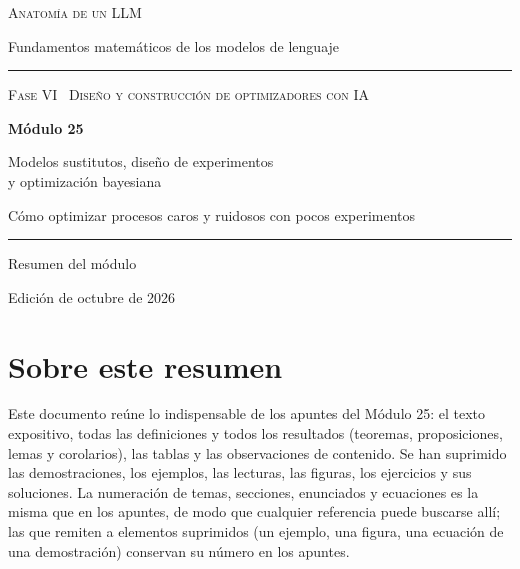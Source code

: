 \documentclass[11pt,a4paper,twoside,openany]{book}
\begin{document}
\frontmatter
\begin{titlepage}
\centering
\vspace*{2.5cm}
{\large\scshape Anatomía de un LLM}\par
\vspace{0.4cm}
{\normalsize Fundamentos matemáticos de los modelos de lenguaje}\par
\vspace{2.2cm}
\rule{\textwidth}{0.8pt}\par\vspace{0.5cm}
{\small\scshape Fase VI \textperiodcentered\ Diseño y construcción de optimizadores con IA}\par\vspace{0.3cm}
{\Huge\bfseries Módulo 25\par}\vspace{0.3cm}
{\LARGE Modelos sustitutos, diseño de experimentos\\[2pt] y optimización bayesiana\par}
\vspace{0.2cm}
{\large Cómo optimizar procesos caros y ruidosos con pocos experimentos\par}
\vspace{0.5cm}\rule{\textwidth}{0.4pt}\par
\vspace{1.6cm}
{\large Resumen del módulo}\par
\vfill
{\small Edición de octubre de 2026}\par
\end{titlepage}

\chapter*{Sobre este resumen}

Este documento reúne lo indispensable de los apuntes del Módulo 25: el texto expositivo, todas las definiciones y todos los resultados (teoremas, proposiciones, lemas y corolarios), las tablas y las observaciones de contenido. Se han suprimido las demostraciones, los ejemplos, las lecturas, las figuras, los ejercicios y sus soluciones. La numeración de temas, secciones, enunciados y ecuaciones es la misma que en los apuntes, de modo que cualquier referencia puede buscarse allí; las que remiten a elementos suprimidos (un ejemplo, una figura, una ecuación de una demostración) conservan su número en los apuntes.
\end{document}
